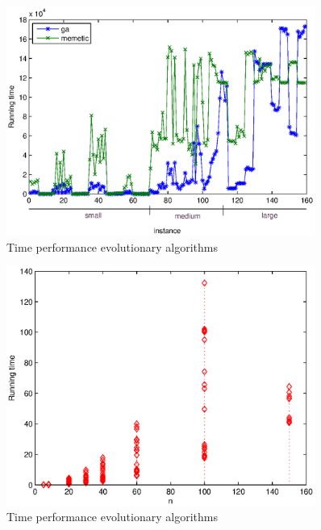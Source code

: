 
\begin{figure}[!htbp]
  \begin{center}
   \includegraphics[width=0.9\textwidth]{Images/Chapter5/compare_times_evol.eps}
  \end{center}
    \caption{Time performance evolutionary algorithms}\label{fig:compare_times_evol}
\end{figure}

\begin{figure}[!htbp]
  \begin{center}
   \includegraphics[width=0.9\textwidth]{Images/Chapter5/compare_times_ra.eps}
  \end{center}
    \caption{Time performance evolutionary algorithms}\label{fig:compare_times_ra}
\end{figure}